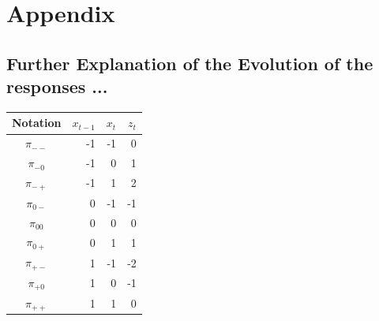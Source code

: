 \documentclass[12pt,a4paper,oneside]{book}
\begin{document}
\chapter*{Appendix}

\section*{Further Explanation of the Evolution of the responses ...}
\begin{center}
\begin{tabular}{|c|r|r|r|}
Notation    &  $x_{t-1}$ & $x_t$ & $z_t$ \\\hline
$\pi_{--}$    &  -1  & -1    & 0 \\
$\pi_{-0}$    &  -1  & 0     & 1 \\
$\pi_{-+}$    &  -1  & 1     & 2 \\
$\pi_{0-}$    &  0   & -1    & -1 \\
$\pi_{00}$    &  0   & 0     & 0 \\
$\pi_{0+}$    &  0   & 1     & 1 \\
$\pi_{+-}$    &  1   & -1    & -2 \\
$\pi_{+0}$    &  1   & 0     & -1 \\
$\pi_{++}$    &  1   & 1     & 0 \\
\end{tabular}  
\end{center}
\end{document}
